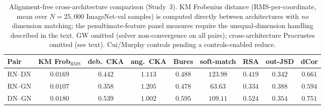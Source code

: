 \begin{table}[h]
\centering
\caption{Alignment-free cross-architecture comparison (Study~3). KM Frobenius distance
(RMS-per-coordinate, mean over $N=25{,}000$ ImageNet-val samples) is computed directly between
architectures with \emph{no} dimension matching; the penultimate-feature panel measures require
the unequal-dimension handling described in the text. GW omitted (solver non-convergence on all
pairs); cross-architecture Procrustes omitted (see text). Cui/Murphy controls pending a
controls-enabled reduce.}
\label{tab:s2_table}
\begin{tabular}{lcccccccc}
\toprule
Pair & KM Frob$_{\mathrm{RMS}}$ & deb.\ CKA & ang.\ CKA & Bures & soft-match & RSA & out-JSD & dCor \\
\midrule
RN--DN & $0.0169$ & $0.442$ & $1.113$ & $0.488$ & $123.98$ & $0.419$ & $0.342$ & $0.661$ \\
RN--GN & $0.0107$ & $0.358$ & $1.205$ & $0.478$ & $63.63$  & $0.334$ & $0.388$ & $0.594$ \\
DN--GN & $0.0180$ & $0.539$ & $1.002$ & $0.595$ & $109.11$ & $0.524$ & $0.354$ & $0.751$ \\
\bottomrule
\end{tabular}
\end{table}
